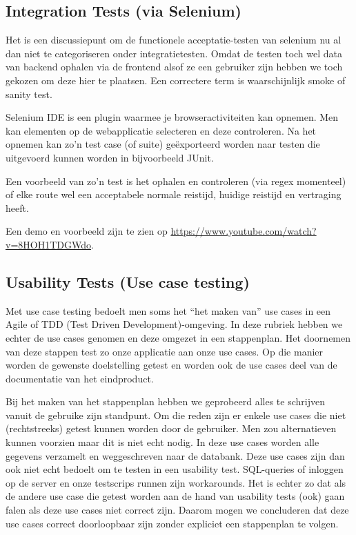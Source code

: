 \subsection{Integration Tests (via Selenium)}

Het is een discussiepunt om de functionele acceptatie-testen van selenium nu al dan niet te categoriseren onder integratietesten. Omdat de testen toch wel data van backend ophalen via de frontend alsof ze een gebruiker zijn hebben we toch gekozen om deze hier te plaatsen. Een correctere term is waarschijnlijk smoke of sanity test.

Selenium IDE is een plugin waarmee je browseractiviteiten kan opnemen. Men kan elementen op de webapplicatie selecteren en deze controleren. Na het opnemen kan zo'n test case (of suite) geëxporteerd worden naar testen die uitgevoerd kunnen worden in bijvoorbeeld JUnit.

Een voorbeeld van zo'n test is het ophalen en controleren (via regex momenteel) of elke route wel een acceptabele normale reistijd, huidige reistijd en vertraging heeft. 

Een demo en voorbeeld zijn te zien op \url{https://www.youtube.com/watch?v=8HOH1TDGWdo}.

\subsection{Usability Tests (Use case testing)}

Met use case testing bedoelt men soms het ``het maken van'' use cases in een Agile of TDD (Test Driven Development)-omgeving. In deze rubriek hebben we echter de use cases genomen en deze omgezet in een stappenplan. Het doornemen van deze stappen test zo onze applicatie aan onze use cases. Op die manier worden de gewenste doelstelling getest en worden ook de use cases deel van de documentatie van het eindproduct.

Bij het maken van het stappenplan hebben we geprobeerd alles te schrijven vanuit de gebruike zijn standpunt. Om die reden zijn er enkele use cases die niet (rechtstreeks) getest kunnen worden door de gebruiker. Men zou alternatieven kunnen voorzien maar dit is niet echt nodig. In deze use cases worden alle gegevens verzamelt en weggeschreven naar de databank. Deze use cases zijn dan ook niet echt bedoelt om te testen in een usability test. SQL-queries of inloggen op de server en onze testscrips runnen zijn workarounds. Het is echter zo dat als de andere use case die getest worden aan de hand van usability tests (ook) gaan falen als deze use cases niet correct zijn. Daarom mogen we concluderen dat deze use cases correct doorloopbaar zijn zonder expliciet een stappenplan te volgen. 

